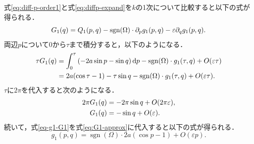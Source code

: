 \documentclass[../main]{subfiles}
\begin{document}
    式\eqref{eq:diff-p-order1}と式\eqref{eq:diffp-expand}を$k$の1次について比較すると以下の式が得られる．
    \begin{equation}
        G_1(q)=Q_1(p,q)-\operatorname{sgn}(\Omega)\cdot \partial_p g_1(p,q)-\varepsilon \partial_q g_1(p,q).
    \end{equation}
    両辺$p$について$0$から$\tau$まで積分すると，以下のようになる．
    \begin{align}
        \tau G_1(q)&=\int_0^{\tau}\left(-2a\sin p-\sin q\right)\dd{p}-\operatorname{sgn}(\Omega)\cdot g_1(\tau,q)+O(\varepsilon\tau)\notag \\
        &=2a(\cos \tau-1)-\tau\sin q-\operatorname{sgn}(\Omega)\cdot g_1(\tau,q)+O(\varepsilon\tau). 
        \label{eq-g1-G1}
    \end{align}
    $\tau$に$2\pi$を代入すると次のようになる．
    \begin{align}
        2\pi G_1(q)&=-2\pi\sin q+O(2\pi\varepsilon),\notag\\
        G_1(q)&=-\sin q+O(\varepsilon).
        \label{eq:G1-approx}
    \end{align}
    続いて，式\eqref{eq-g1-G1}を式\eqref{eq:G1-approx}に代入すると以下の式が得られる．
    \begin{equation}
        g_1(p,q)=\operatorname{sgn}(\Omega)\cdot 2a(\cos p-1)+O(\varepsilon p).
        \label{eq:g1-approx}
    \end{equation}
\end{document}
